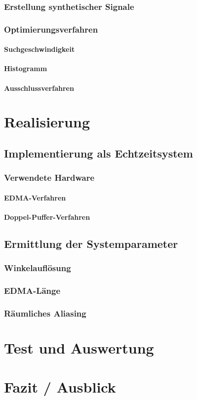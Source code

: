 		\subsection{Erstellung synthetischer Signale}
		\subsection{Optimierungsverfahren}
		\subsubsection{Suchgeschwindigkeit}
		\subsubsection{Histogramm}
		\subsubsection{Ausschlussverfahren}
	
	
\chapter{Realisierung}

	\section{Implementierung als Echtzeitsystem}
		\subsection{Verwendete Hardware}
			\subsubsection{EDMA-Verfahren}
			\subsubsection{Doppel-Puffer-Verfahren}
    
    \section{Ermittlung der Systemparameter}
        \subsection{Winkelauflösung}
        \subsection{EDMA-Länge}
        \subsection{Räumliches Aliasing}
    
    
\chapter{Test und Auswertung}




\chapter{Fazit / Ausblick}



